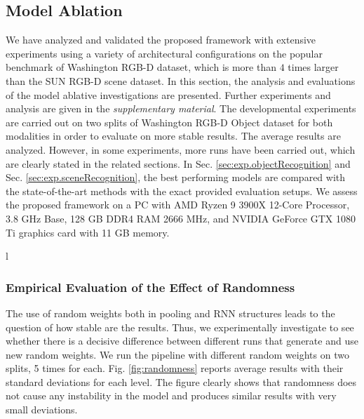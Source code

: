 \subsection{Model Ablation} \label{sec:exp.modelAblation}
\begin{figure*}[!ht]
	\centering
	\caption{Effect of randomness on the accuracy results for each level (L1 to L7). Values indicate standard deviations.}
	\label{fig:randomness}
\end{figure*}
We have analyzed and validated the proposed framework with extensive experiments using a variety of architectural configurations on the popular benchmark of Washington RGB-D dataset, which is more than $4$ times larger than the SUN RGB-D scene dataset. In this section, the analysis and evaluations of the model ablative investigations are presented. Further experiments and analysis are given in the \textit{supplementary material}. The developmental experiments are carried out on two splits of Washington RGB-D Object dataset for both modalities in order to evaluate on more stable results. The average results are analyzed. However, in some experiments, more runs have been carried out, which are clearly stated in the related sections. In Sec. \ref{sec:exp.objectRecognition} and Sec. \ref{sec:exp.sceneRecognition}, the best performing models are compared with the state-of-the-art methods with the exact provided evaluation setups. We assess the proposed framework on a PC with AMD Ryzen 9 3900X 12-Core Processor, 3.8 GHz Base, 128 GB DDR4 RAM 2666 MHz, and NVIDIA GeForce GTX 1080 Ti graphics card with 11 GB memory.
\begin{figure*}[!b]
	\centering
	 l	\caption{Level-wise average accuracy performance of different baseline models on all the 10-splits of Washington RGB-D dataset.}
	\label{fig:levelwisePerformances}
\end{figure*}
\subsubsection{Empirical Evaluation of the Effect of Randomness}
\label{sec.exp.ma.randomness}
The use of random weights both in pooling and RNN structures leads to the question of how stable are the results. Thus, we experimentally investigate to see whether there is a decisive difference between different runs that generate and use new random weights. We run the pipeline with different random weights on two splits, 5 times for each. Fig. \ref{fig:randomness} reports average results with their standard deviations for each level. The figure clearly shows that randomness does not cause any instability in the model and produces similar results with very small deviations.

